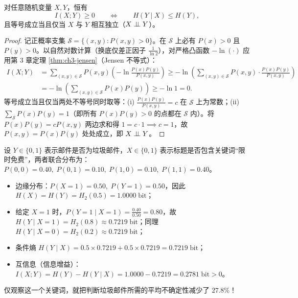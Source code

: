 \begin{thmBox}
\begin{theorem}
\label{thm:ch4-mi-nonneg}
对任意随机变量 $X, Y$，恒有
\begin{equation}
  I(X; Y) \ge 0 \qquad \Longleftrightarrow \qquad H(Y \mid X) \le H(Y), \label{eq:ch4-mi-nonneg}
\end{equation}
且等号成立当且仅当 $X$ 与 $Y$ 相互独立（$X \perp\!\!\!\perp Y$）。
\end{theorem}
\end{thmBox}

\begin{proof}
记正概率支集 $\mathcal{S} = \{(x, y) : P(x, y) > 0\}$。在 $\mathcal{S}$ 上必有 $P(x) > 0$ 且 $P(y) > 0$。以自然对数计算（换底仅差正因子 $\frac{1}{\ln 2}$），对严格凸函数 $-\ln(\cdot)$ 应用第 3 章定理 \ref{thm:ch3-jensen}（Jensen 不等式）：
\begin{align*}
  I(X; Y)
  &= \sum_{(x,y)\in\mathcal{S}} P(x,y)\left(-\ln\frac{P(x)P(y)}{P(x,y)}\right)
   \ge -\ln\!\left(\sum_{(x,y)\in\mathcal{S}} P(x,y)\cdot\frac{P(x)P(y)}{P(x,y)}\right) \\
  &= -\ln\!\left(\sum_{(x,y)\in\mathcal{S}} P(x)P(y)\right)
   \ge -\ln 1 = 0.
\end{align*}
等号成立当且仅当两处不等号同时取等：(i) $\frac{P(x)P(y)}{P(x,y)} = c$ 在 $\mathcal{S}$ 上为常数；(ii) $\sum_{\mathcal{S}} P(x)P(y) = 1$（即所有 $P(x)P(y)>0$ 的点都在 $\mathcal{S}$ 内）。将 $P(x)P(y) = c P(x,y)$ 两边求和得 $1 = c \cdot 1 \implies c = 1$，故 $P(x,y) = P(x)P(y)$ 处处成立，即 $X \perp\!\!\!\perp Y$。
\end{proof}

\begin{example}[垃圾邮件关键词过滤的信息增益手算]
\label{ex:ch4-spam-mi}
设 $Y \in \{0, 1\}$ 表示邮件是否为垃圾邮件，$X \in \{0, 1\}$ 表示标题是否包含关键词“限时免费”，两者联合分布为：$P(0,0) = 0.40,\; P(0,1) = 0.10,\; P(1,0) = 0.10,\; P(1,1) = 0.40$。
\begin{itemize}
  \item 边缘分布：$P(X=1) = 0.50,\; P(Y=1) = 0.50$，因此 $H(X) = H(Y) = H_2(0.5) = 1.0000\;\text{bit}$；
  \item 给定 $X=1$ 时，$P(Y=1\mid X=1) = \frac{0.40}{0.50} = 0.80$，故 $H(Y\mid X=1) = H_2(0.8) \approx 0.7219\;\text{bit}$；同理 $H(Y\mid X=0) = H_2(0.2) \approx 0.7219\;\text{bit}$；
  \item 条件熵 $H(Y\mid X) = 0.5 \times 0.7219 + 0.5 \times 0.7219 = 0.7219\;\text{bit}$；
  \item 互信息（信息增益）：$I(X; Y) = H(Y) - H(Y\mid X) = 1.0000 - 0.7219 = 0.2781\;\text{bit} > 0$。
\end{itemize}
仅观察这一个关键词，就把判断垃圾邮件所需的平均不确定性减少了 $27.8\%$！
\end{example}

